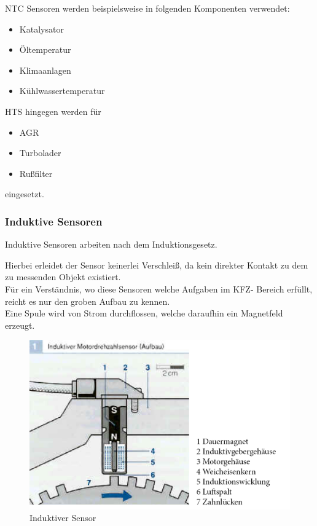 \begin{flushleft}
				NTC Sensoren werden beispielsweise in folgenden Komponenten verwendet:
				
				\begin{itemize}
					\item Katalysator
					\item Öltemperatur
					\item Klimaanlagen
					\item Kühlwassertemperatur 	
				\end{itemize}
				
	            HTS hingegen werden für
	            
				\begin{itemize}
					\item AGR
					\item Turbolader
					\item Rußfilter 
	            \end{itemize}
	            
	            eingesetzt.
	
	            \subsubsection{Induktive Sensoren}
			
	            Induktive Sensoren arbeiten nach dem Induktionsgesetz.
	            
				Hierbei erleidet der Sensor keinerlei Verschleiß, da kein direkter Kontakt zu dem zu messenden Objekt existiert.\\
				Für ein Verständnis, wo diese Sensoren welche Aufgaben im KFZ- Bereich erfüllt, reicht es nur den groben Aufbau zu kennen.\\
				Eine Spule wird von Strom durchflossen, welche daraufhin ein Magnetfeld erzeugt.\\	
	
				\begin{figure}[h]
					\centering
					\includegraphics{Induktiv_mit_legende.jpg}
					\caption[www.kfztech.de/kfztechnik/elo/sensoren/induktivgeber.htm]{Induktiver Sensor}
					\label{fig:TS03}
				\end{figure}
				

\end{flushleft}
